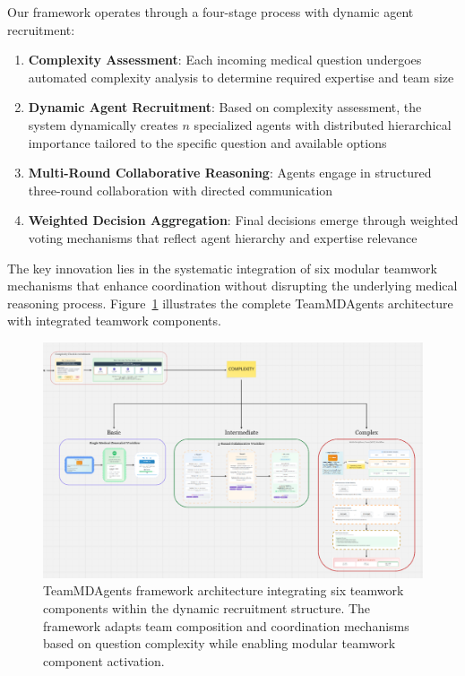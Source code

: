 \documentclass[letterpaper]{article} %
\begin{document}
Our framework operates through a four-stage process with dynamic agent recruitment:

\begin{enumerate}
    \item \textbf{Complexity Assessment}: Each incoming medical question undergoes automated complexity analysis to determine required expertise and team size
    \item \textbf{Dynamic Agent Recruitment}: Based on complexity assessment, the system dynamically creates $n$ specialized agents with distributed hierarchical importance tailored to the specific question and available options
    \item \textbf{Multi-Round Collaborative Reasoning}: Agents engage in structured three-round collaboration with directed communication
    \item \textbf{Weighted Decision Aggregation}: Final decisions emerge through weighted voting mechanisms that reflect agent hierarchy and expertise relevance
\end{enumerate}

The key innovation lies in the systematic integration of six modular teamwork mechanisms that enhance coordination without disrupting the underlying medical reasoning process. Figure~\ref{fig:framework} illustrates the complete TeamMDAgents architecture with integrated teamwork components.

\begin{figure}[htbp]
\centering
\includegraphics[width=0.95\columnwidth]{framework.png}
\caption{TeamMDAgents framework architecture integrating six teamwork components within the dynamic recruitment structure. The framework adapts team composition and coordination mechanisms based on question complexity while enabling modular teamwork component activation.}
\label{fig:framework}
\end{figure}
\end{document}

